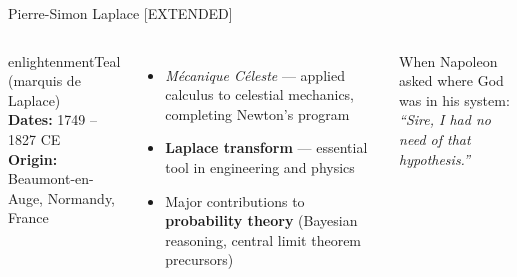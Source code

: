 \begin{frame}[shrink=20]{Pierre-Simon Laplace \hfill {\small\textcolor{enlightenmentTeal!60}{[EXTENDED]}}}
  \begin{columns}[T]
    \begin{personbox}{enlightenmentTeal}
      {\small (marquis de Laplace)}\\[3pt]
      \textbf{Dates:} 1749 -- 1827 CE\\
      \textbf{Origin:} Beaumont-en-Auge, Normandy, France
    \end{personbox}
    \vspace{0.3em}
    \begin{itemize}
      \item \textit{M\'{e}canique C\'{e}leste} --- applied calculus to celestial mechanics, completing Newton's program
      \item \textbf{Laplace transform} --- essential tool in engineering and physics
      \item Major contributions to \textbf{probability theory} (Bayesian reasoning, central limit theorem precursors)
    \end{itemize}

    \vspace{0.3em}
    {\footnotesize When Napoleon asked where God was in his system:}\\
    {\small\itshape ``Sire, I had no need of that hypothesis.''}


    \vspace{0.5em}
  \end{columns}

\end{frame}

